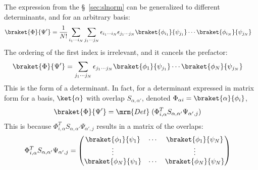 \documentclass[10pt]{article}
\begin{document}
  The expression from the \S~\ref{sec:slnorm} can be generalized to different determinants, and for an arbitrary basis:
  \begin{align}
    \braket{\Phi}{\Psi'}
    &=
    \frac 1{N!} \sum_{i_1\cdots i_N} \sum_{j_1\cdots j_N}
    \epsilon_{i_1 \cdots i_N}  \epsilon_{j_1 \cdots j_N}  
    \braket{\phi_{i_1}}{\psi_{j_1}}
    \cdots
    \braket{\phi_{i_N}}{\psi_{j_N}}
  \end{align}
  The ordering of the first index is irrelevant, and it cancels the prefactor:
  \begin{align}
    \braket{\Phi}{\Psi'}
    &=
    \sum_{j_1\cdots j_N}
    \epsilon_{j_1 \cdots j_N}  
    \braket{\phi_{1}}{\psi_{j_1}}
    \cdots
    \braket{\phi_{N}}{\psi_{j_N}}
  \end{align}
  This is the form of a determinant. In fact, for a determinant expressed in matrix form for a basis, $\ket{\alpha}$ with overlap $S_{\alpha,\alpha'}$, denoted $\Phi_{\alpha i} = \braket{\alpha}{\phi_i}$,
  \begin{align}
    \braket{\Phi}{\Psi'}
    &=
    \mrm{Det}\;(\Phi^T_{i,\alpha} S_{\alpha,\alpha'} \Psi_{\alpha',j})
  \end{align}
  This is because $\Phi^T_{i,\alpha} S_{\alpha,\alpha'} \Psi_{\alpha',j}$ results in a matrix of the overlaps:
  \begin{align}
    \Phi^T_{i,\alpha} S_{\alpha,\alpha'} \Psi_{\alpha',j}
    &=
    \begin{pmatrix}
      \braket{\phi_1}{\psi_1} & \cdots & \braket{\phi_1}{\psi_N} \\
      \vdots                 &        & \vdots \\
      \braket{\phi_N}{\psi_1} & \cdots & \braket{\phi_N}{\psi_N}
    \end{pmatrix}
  \end{align}
\end{document}
